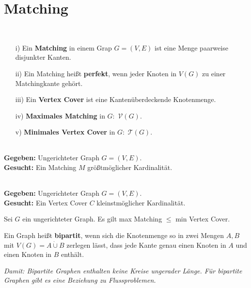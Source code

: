 \section{Matching}
\begin{definition}[Matching]~
	\begin{itemize}
		\item[i)] Ein \textbf{Matching} in einem Grap $G=(V,E)$ ist eine Menge paarweise disjunkter Kanten.
		\item[ii)] Ein Matching heißt \textbf{perfekt}, wenn jeder Knoten in $V(G)$ zu einer Matchingkante gehört.
		\item[iii)] Ein \textbf{Vertex Cover} ist eine Kantenüberdeckende Knotenmenge.
		\item[iv)] \textbf{Maximales Matching} in $G:$ $\mathcal{V}(G)$.
		\item[v)] \textbf{Minimales Vertex Cover} in $G:$ $\mathcal{T}(G)$.
	\end{itemize}
\end{definition}
\begin{problem}~\\[5pt]
	\hspace*{10pt}\textbf{Gegeben: }Ungerichteter Graph $G = (V,E)$.\\[5pt]
	\hspace*{10pt}\textbf{Gesucht: }Ein Matching $M$ größtmöglicher Kardinalität.
\end{problem}
\begin{problem}~\\[5pt]
	\hspace*{10pt}\textbf{Gegeben: }Ungerichteter Graph $G = (V,E)$.\\[5pt]
	\hspace*{10pt}\textbf{Gesucht: }Ein Vertex Cover $C$ kleinstmöglicher Kardinalität.
\end{problem}
\begin{satz}
	Sei $G$ ein ungerichteter Graph. Es gilt max Matching $\le$ min Vertex Cover.
\end{satz}
\begin{definition}
	Ein Graph heißt \textbf{bipartit}, wenn sich die Knotenmenge so in zwei Mengen $A,B$ mit $V(G) = A \dot\cup B$ zerlegen lässt, dass jede Kante genau einen Knoten in $A$ und einen Knoten in $B$ enthält.
\end{definition}
\textit{Damit: Bipartite Graphen enthalten keine Kreise ungerader Länge. Für bipartite Graphen gibt es eine Beziehung zu Flussproblemen.}
